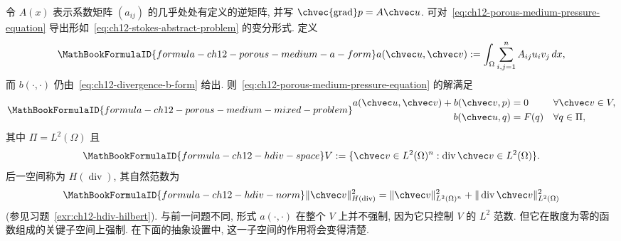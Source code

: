 令 $A(x)$ 表示系数矩阵 $(a_{ij})$ 的几乎处处有定义的逆矩阵, 并写 $\chvec{\operatorname{grad}}p=A\chvec u$. 可对~\eqref{eq:ch12-porous-medium-pressure-equation} 导出形如~\eqref{eq:ch12-stokes-abstract-problem} 的变分形式. 定义
\begin{equation}
\MathBookFormulaID{formula-ch12-porous-medium-a-form}
\label{eq:ch12-porous-medium-a-form}
a(\chvec u,\chvec v):=
\int_\Omega\sum_{i,j=1}^n A_{ij}u_i v_j\,dx,
\end{equation}
而 $b(\cdot,\cdot)$ 仍由~\eqref{eq:ch12-divergence-b-form} 给出. 则~\eqref{eq:ch12-porous-medium-pressure-equation} 的解满足
\begin{equation}
\MathBookFormulaID{formula-ch12-porous-medium-mixed-problem}
\label{eq:ch12-porous-medium-mixed-problem}
\begin{aligned}
a(\chvec u,\chvec v)+b(\chvec v,p)&=0&&\forall\chvec v\in V,\\
b(\chvec u,q)&=F(q)&&\forall q\in\Pi,
\end{aligned}
\end{equation}
其中 $\Pi=L^2(\Omega)$ 且
\[
\MathBookFormulaID{formula-ch12-hdiv-space}
V:=\{\chvec v\in L^2(\Omega)^n:\operatorname{div}\chvec v\in L^2(\Omega)\}.
\]
后一空间称为 $H(\operatorname{div})$, 其自然范数为
\begin{equation}
\MathBookFormulaID{formula-ch12-hdiv-norm}
\label{eq:ch12-hdiv-norm}
\|\chvec v\|_{H(\operatorname{div})}^2
=\|\chvec v\|_{L^2(\Omega)^n}^2
+\|\operatorname{div}\chvec v\|_{L^2(\Omega)}^2
\end{equation}
(参见习题~\ref{exr:ch12-hdiv-hilbert}). 与前一问题不同, 形式 $a(\cdot,\cdot)$ 在整个 $V$ 上并不强制, 因为它只控制 $V$ 的 $L^2$ 范数. 但它在散度为零的函数组成的关键子空间上强制. 在下面的抽象设置中, 这一子空间的作用将会变得清楚.
